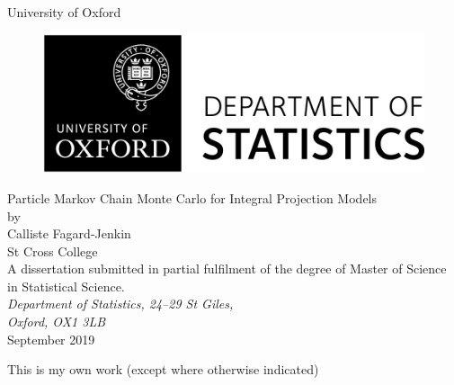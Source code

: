 \documentclass[a4paper,12pt]{article}
\begin{document}
 

\begin{titlepage}
\begin{center}
\vspace{1cm}
\textsf{\Huge{University of Oxford \\}}
\vspace{1cm}
\begin{figure}[htb]
\centering
\includegraphics[scale=.8]{Stats_Logo.png}
\end{figure}
\vspace{2.0cm}
\Huge{Particle Markov Chain Monte Carlo for Integral Projection Models\\}
\vspace{2.0cm}
\large{ by \\[14pt] Calliste Fagard-Jenkin \\[8pt] St Cross College} \\
\vspace{2.2cm}
\large{A dissertation submitted in partial fulfilment of the degree of Master of Science in Statistical Science.
} \\
\vspace{.5cm}
\large{\emph{Department of Statistics, 24--29 St Giles, \\Oxford, OX1 3LB}} \\
\vspace{1.0cm}
\large{September 2019} \\
\end{center}
\end{titlepage}
\clearpage

This is my own work (except where otherwise indicated)
\vspace{2.5in}
\end{document}
